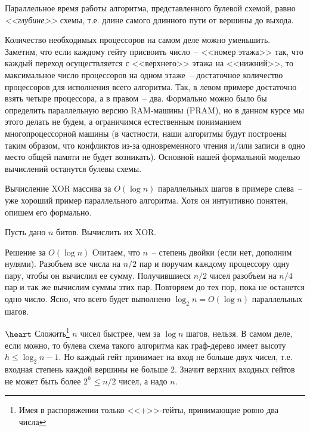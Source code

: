 \begin{definition*}
Параллельное время работы алгоритма, представленного булевой схемой,
равно
\textit{<<глубине>>} схемы, т.е. длине самого длинного пути от вершины до выхода.
\end{definition*}

Количество необходимых процессоров на самом деле можно уменьшить.
Заметим, что если каждому гейту присвоить число~-- <<номер этажа>> так, что каждый переход осуществляется с <<верхнего>> этажа на <<нижний>>, то максимальное число процессоров на одном этаже~-- достаточное количество процессоров для исполнения всего алгоритма. Так, в левом примере достаточно взять четыре процессора, а в правом~-- два.
Формально можно было бы определить параллельную версию RAM-машины (PRAM),
но в данном курсе мы этого делать не будем,
а ограничимся естественным пониманием многопроцессорной машины
(в частности, наши алгоритмы будут построены таким образом, что
конфликтов из-за одновременного чтения и/или записи
в одно место общей памяти не будет возникать).
Основной нашей формальной моделью вычислений останутся булевы схемы.

Вычисление XOR массива за $O(\log n)$ параллельных шагов в примере слева~-- уже хороший пример параллельного алгоритма. Хотя он интуитивно понятен, опишем его формально.

\begin{problem*}
	Пусть дано $n$ битов. Вычислить их XOR.
\end{problem*}

\begin{algodescription}{Решение за $O(\log n)$} Считаем, что $n$~-- степень двойки (если нет, дополним нулями).  Разобъем все числа на $n/2$ пар и поручим каждому процессору одну пару, чтобы он вычислил ее сумму. Получившиеся $n/2$ чисел разобъем на $n/4$ пар и так же вычислим суммы этих пар. Повторяем до тех пор, пока не останется одно число. Ясно, что всего будет выполнено $\log_2 n = O(\log n)$ параллельных шагов.
\end{algodescription}

\begin{nb*} $\heart$ Сложить\footnote{Имея в распоряжении только <<+>>-гейты, принимающие ровно два числа} $n$ чисел быстрее, чем за $\log n$ шагов, нельзя. В самом деле, если можно, то булева схема такого алгоритма как граф-дерево имеет высоту $h \leq \log_2 n - 1$. Но каждый гейт принимает на вход не больше двух чисел, т.е. входная степень каждой вершины не больше 2. Значит верхних входных гейтов не может быть более $2^h \leq n/2$  чисел, а надо $n$.
\end{nb*}

